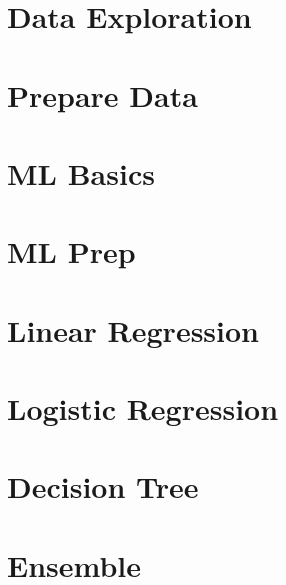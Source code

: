 
 \section[EDA]{Data Exploration}
 

 \section[Prep]{Prepare Data}
 

\section[ML Basics]{ML Basics}




\section[ML Prep]{ML Prep}



\section[LinRegr]{Linear Regression}




\section[LogiRegr]{Logistic Regression}





\section[Tree]{Decision Tree}



\section[Ensemble]{Ensemble}




